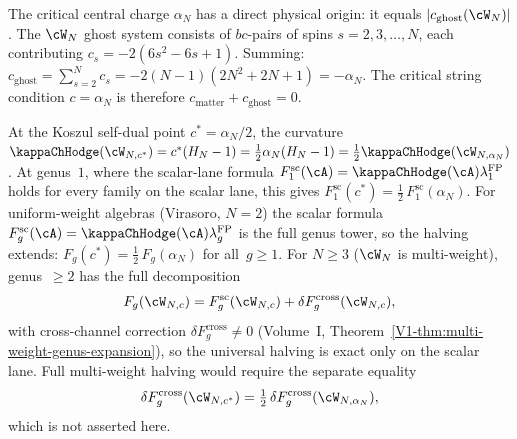 \begin{remark}%
\label{rem:ghost-identity-alphaN}%
%
The critical central charge $\alpha_N$ has a direct
physical origin: it equals $|c_{\mathrm{ghost}}(\cW_N)|$.
The $\cW_N$ ghost system consists of $bc$-pairs of
spins $s = 2, 3, \ldots, N$, each contributing
$c_s = -2(6s^2 - 6s + 1)$. Summing:
$c_{\mathrm{ghost}} = \sum_{s=2}^{N} c_s
= -2(N{-}1)(2N^2{+}2N{+}1) = -\alpha_N$.
The critical string condition $c = \alpha_N$ is
therefore $c_{\mathrm{matter}} + c_{\mathrm{ghost}} = 0$.
\end{remark}

\begin{remark}%
\label{rem:self-dual-halving}%
%
At the Koszul self-dual point $c^* = \alpha_N/2$,
the curvature $\kappaChHodge(\cW_{N,c^*}) = c^*(H_N - 1)
= \tfrac{1}{2}\alpha_N(H_N - 1)
= \tfrac{1}{2}\kappaChHodge(\cW_{N,\alpha_N})$.
At genus~$1$, where the scalar-lane formula
$F_1^{\mathrm{sc}}(\cA)=\kappaChHodge(\cA)\lambda_1^{\mathrm{FP}}$ holds
for every family on the scalar lane, this gives
$F_1^{\mathrm{sc}}(c^*) =
\tfrac{1}{2}\,F_1^{\mathrm{sc}}(\alpha_N)$.
For uniform-weight algebras (Virasoro, $N = 2$) the
scalar formula
$F_g^{\mathrm{sc}}(\cA)=\kappaChHodge(\cA)\lambda_g^{\mathrm{FP}}$
is the full genus tower, so the halving extends:
$F_g(c^*) = \tfrac{1}{2}\,F_g(\alpha_N)$ for all~$g \ge 1$.
For $N \ge 3$ ($\cW_N$ is multi-weight), genus~$\ge 2$
has the full decomposition
\[
F_g(\cW_{N,c})
=F_g^{\mathrm{sc}}(\cW_{N,c})
+\delta F_g^{\mathrm{cross}}(\cW_{N,c}),
\]
with cross-channel correction
$\delta F_g^{\mathrm{cross}} \ne 0$
(Volume~I, Theorem~\textup{\ref{V1-thm:multi-weight-genus-expansion}}),
so the universal halving is exact only on the scalar lane.  Full
multi-weight halving would require the separate equality
\[
\delta F_g^{\mathrm{cross}}(\cW_{N,c^*})
=\tfrac12\,\delta F_g^{\mathrm{cross}}(\cW_{N,\alpha_N}),
\]
which is not asserted here.
\end{remark}

